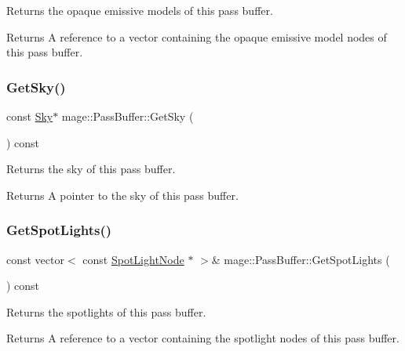Returns the opaque emissive models of this pass buffer.

\begin{DoxyReturn}{Returns}
A reference to a vector containing the opaque emissive model nodes of this pass buffer. 
\end{DoxyReturn}
\hypertarget{structmage_1_1_pass_buffer_af6355cb9bd927f53bb93347348f21a11}{}\label{structmage_1_1_pass_buffer_af6355cb9bd927f53bb93347348f21a11} 
\subsubsection{\texorpdfstring{Get\+Sky()}{GetSky()}}
{\footnotesize\ttfamily const \hyperlink{structmage_1_1_sky}{Sky}$\ast$ mage\+::\+Pass\+Buffer\+::\+Get\+Sky (\begin{DoxyParamCaption}{ }\end{DoxyParamCaption}) const\hspace{0.3cm}{\ttfamily [noexcept]}}

Returns the sky of this pass buffer.

\begin{DoxyReturn}{Returns}
A pointer to the sky of this pass buffer. 
\end{DoxyReturn}
\hypertarget{structmage_1_1_pass_buffer_a73b50abb85924fcd1f52239ab7e3ecda}{}\label{structmage_1_1_pass_buffer_a73b50abb85924fcd1f52239ab7e3ecda} 
\subsubsection{\texorpdfstring{Get\+Spot\+Lights()}{GetSpotLights()}}
{\footnotesize\ttfamily const vector$<$ const \hyperlink{namespacemage_aeed5dee4ff6c591eabb0e9114256df4a}{Spot\+Light\+Node} $\ast$ $>$\& mage\+::\+Pass\+Buffer\+::\+Get\+Spot\+Lights (\begin{DoxyParamCaption}{ }\end{DoxyParamCaption}) const\hspace{0.3cm}{\ttfamily [noexcept]}}

Returns the spotlights of this pass buffer.

\begin{DoxyReturn}{Returns}
A reference to a vector containing the spotlight nodes of this pass buffer. 
\end{DoxyReturn}
\hypertarget{structmage_1_1_pass_buffer_a8f290f22cc01bbb4ec7f0986e0e0f3a1}{}\label{structmage_1_1_pass_buffer_a8f290f22cc01bbb4ec7f0986e0e0f3a1} 
